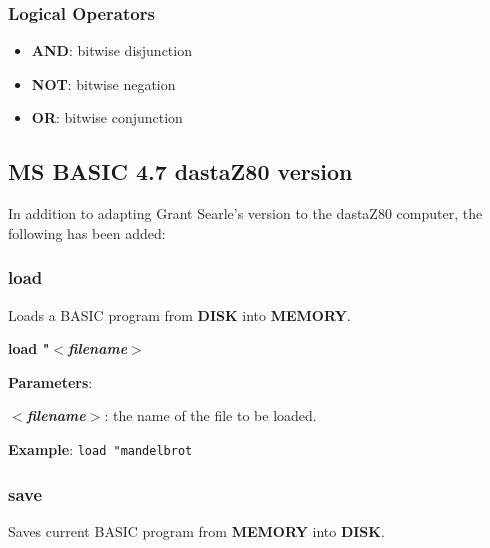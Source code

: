 \documentclass[a4paper,11pt]{article}
\begin{document}
    \subsubsection{Logical Operators}

    \begin{itemize}
        \item \textbf{AND}: bitwise disjunction
        \item \textbf{NOT}: bitwise negation
        \item \textbf{OR}: bitwise conjunction
    \end{itemize}

    \subsection{MS BASIC 4.7 dastaZ80 version}

    In addition to adapting Grant Searle's version to the dastaZ80 computer,
    the following has been added:

    \subsubsection{{\color{blue}load}}
    Loads a BASIC program from \textbf{DISK} into \textbf{MEMORY}.

    \hspace{1.9cm}\textbf{load "\textit{$<$filename$>$}}

    \textbf{Parameters}:

    \hspace{1cm}\textbf{\textit{$<$filename$>$}}: the name of the file to be
    loaded.

    \textbf{Example}: \texttt{load "mandelbrot}

    \subsubsection{{\color{blue}save}}
    Saves current BASIC program from \textbf{MEMORY} into \textbf{DISK}.
\end{document}
